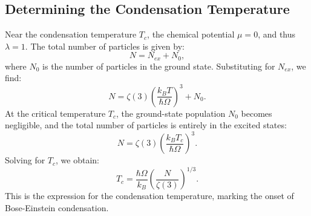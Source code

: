 \documentclass{article}
\numberwithin{equation}{section}
\numberwithin{equation}{subsection}
\begin{document}
\subsection{Determining the Condensation Temperature}
Near the condensation temperature \( T_c \), the chemical potential \( \mu = 0 \), and thus \( \lambda = 1 \). The total number of particles is given by:
\begin{equation}
    N = N_{ex} + N_0,
\end{equation}
where \( N_0 \) is the number of particles in the ground state. Substituting for \( N_{ex} \), we find:
\begin{equation}
    N = \zeta(3) \left(\frac{k_B T}{\hbar \Omega}\right)^3 + N_0.
\end{equation}
At the critical temperature \( T_c \), the ground-state population \( N_0 \) becomes negligible, and the total number of particles is entirely in the excited states:
\begin{equation}
    N = \zeta(3) \left(\frac{k_B T_c}{\hbar \Omega}\right)^3.
\end{equation}
Solving for \( T_c \), we obtain:
\begin{equation}
    T_c = \frac{\hbar \Omega}{k_B} \left(\frac{N}{\zeta(3)}\right)^{1/3}.
\end{equation}
This is the expression for the condensation temperature, marking the onset of Bose-Einstein condensation.
\end{document}
